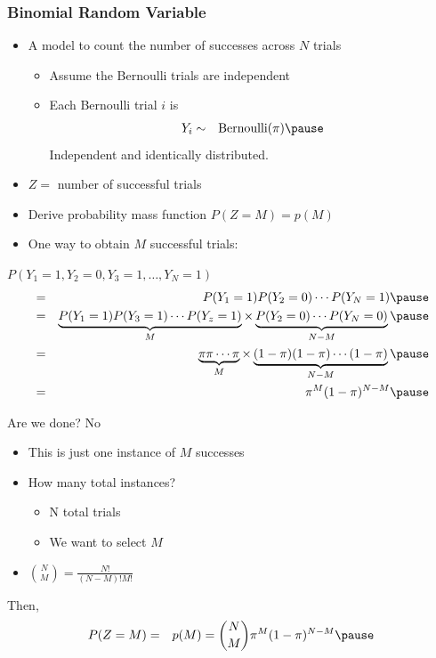 \documentclass[handout]{beamer}
\numberwithin{equation}{section}
\begin{document}
\begin{frame}
\frametitle{Binomial Random Variable}

\begin{itemize}
\item[-] A model to count the number of successes across $N$ trials \pause 
\begin{itemize}
\item[-] Assume the Bernoulli trials are independent \pause 
\item[-] Each Bernoulli trial $i$ is  \pause 
\begin{eqnarray}
Y_{i} & \sim & \text{Bernoulli} (\pi) \nonumber  \pause 
\end{eqnarray}
Independent and identically distributed.   \pause 
\end{itemize}
\item[-] $Z = $ number of successful trials \pause 
\item[-] Derive probability mass function $P(Z = M) = p(M) $ \pause 
\item[-] One way to obtain $M$ successful trials: \pause 
\end{itemize}
$P(Y_{1} = 1, Y_{2}=0, Y_{3} = 1,  \hdots, Y_{N} = 1)$ \pause 
\begin{eqnarray}
 & = & P(Y_{1}=1)P(Y_{2} =0)\cdots P(Y_{N} =1) \pause  \nonumber \\
										& = & \underbrace{P(Y_{1} = 1)P(Y_{3}=1)\cdots P(Y_{z} = 1)}_{M} \times\underbrace{P(Y_{2}= 0) \cdots P(Y_{N} = 0)}_{N-M}  \nonumber \pause  \\										
										& = & \underbrace{\pi \pi \cdots \pi}_{M} \times \underbrace{(1-\pi)(1-\pi) \cdots (1- \pi) }_{N-M} \nonumber \pause  \\
										& = & \pi^{M}(1-\pi)^{N - M} \nonumber \pause  
\end{eqnarray}


\end{frame}


\begin{frame}
Are we done? \pause   \alert{No}  \pause \\
\begin{itemize}
\item[-] This is just one instance of $M$ successes \pause 
\item[-] How many total instances? \pause 
\begin{itemize}
\item[-] N total trials \pause 
\item[-] We want to select $M$  \pause 
\end{itemize}
\item[-] ${{N}\choose{M}} = \frac{N!}{(N-M)! M!}$ \pause 
\end{itemize}
Then,  \pause 
\begin{eqnarray}
P(Z = M) & = &  p(M) = {{N}\choose{M}}\pi^{M} (1- \pi)^{N-M} \nonumber  \pause 
\end{eqnarray}



\end{frame}
\end{document}
